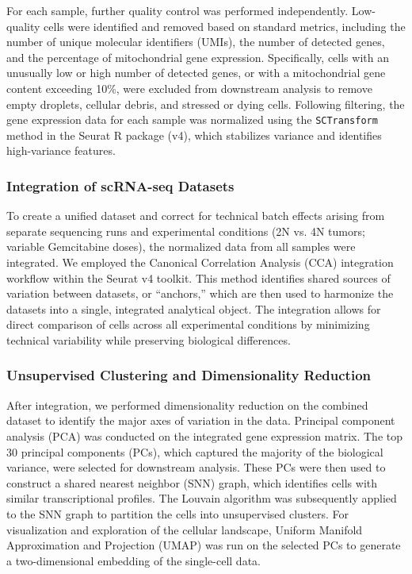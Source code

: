 \documentclass{article}
\begin{document}
For each sample, further quality control was performed independently. Low-quality cells were identified and removed based on standard metrics, including the number of unique molecular identifiers (UMIs), the number of detected genes, and the percentage of mitochondrial gene expression. Specifically, cells with an unusually low or high number of detected genes, or with a mitochondrial gene content exceeding 10\%, were excluded from downstream analysis to remove empty droplets, cellular debris, and stressed or dying cells. Following filtering, the gene expression data for each sample was normalized using the \texttt{SCTransform} method in the Seurat R package (v4), which stabilizes variance and identifies high-variance features.

\subsubsection{Integration of scRNA-seq Datasets}
To create a unified dataset and correct for technical batch effects arising from separate sequencing runs and experimental conditions (2N vs. 4N tumors; variable Gemcitabine doses), the normalized data from all samples were integrated. We employed the Canonical Correlation Analysis (CCA) integration workflow within the Seurat v4 toolkit. This method identifies shared sources of variation between datasets, or ``anchors,'' which are then used to harmonize the datasets into a single, integrated analytical object. The integration allows for direct comparison of cells across all experimental conditions by minimizing technical variability while preserving biological differences.

\subsubsection{Unsupervised Clustering and Dimensionality Reduction}
After integration, we performed dimensionality reduction on the combined dataset to identify the major axes of variation in the data. Principal component analysis (PCA) was conducted on the integrated gene expression matrix. The top 30 principal components (PCs), which captured the majority of the biological variance, were selected for downstream analysis. These PCs were then used to construct a shared nearest neighbor (SNN) graph, which identifies cells with similar transcriptional profiles. The Louvain algorithm was subsequently applied to the SNN graph to partition the cells into unsupervised clusters. For visualization and exploration of the cellular landscape, Uniform Manifold Approximation and Projection (UMAP) was run on the selected PCs to generate a two-dimensional embedding of the single-cell data.
\end{document}
